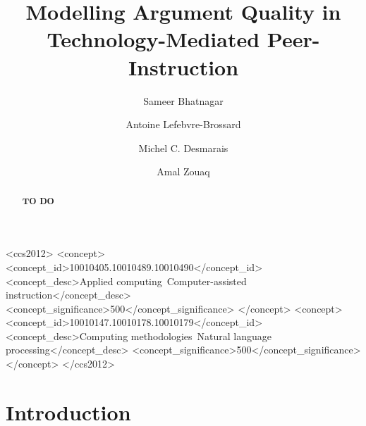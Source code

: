 \documentclass[sigconf]{acmart}
\begin{document}
\title{Modelling Argument Quality in Technology-Mediated 
Peer-Instruction}

\author{Sameer Bhatnagar}
\author{Antoine Lefebvre-Brossard}
\author{Michel C. Desmarais}
\author{Amal Zouaq}


\renewcommand{\shortauthors}{Bhatnagar, et al.}

\begin{abstract}
\textbf{TO DO}
\end{abstract}


\begin{CCSXML}
	<ccs2012>
	<concept>
	<concept_id>10010405.10010489.10010490</concept_id>
	<concept_desc>Applied 
	computing~Computer-assisted 
	instruction</concept_desc>
	<concept_significance>500</concept_significance>
	</concept>
	<concept>
	<concept_id>10010147.10010178.10010179</concept_id>
	<concept_desc>Computing methodologies~Natural 
	language processing</concept_desc>
	<concept_significance>500</concept_significance>
	</concept>
	</ccs2012>
\end{CCSXML}





\maketitle

\section{Introduction}
\end{document}
